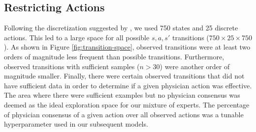 \documentclass[letterpaper]{article}
\begin{document}
\subsection{Restricting Actions}

Following the discretization suggested by \cite{DBLP:journals/corr/RaghuKCSG17}, we used 750 states and 25 discrete actions.
This led to a large space for all possible $s, a, s'$ transitions ($750 \times 25 \times 750$). 
As shown in Figure \ref{fig:transition-space}, observed transitions were at least two orders of magnitude
less frequent than possible transitions. Furthermore, observed transitions with sufficient 
samples ($n > 30$) were another order of magnitude smaller. Finally, there were certain
observed transitions that did not have sufficient data in order to determine if a given
physician action was effective. The area where there were sufficient examples but no physician consensus 
was deemed as the ideal exploration space for our mixture of experts. The percentage of physician 
consensus of a given action over all observed actions was a tunable hyperparameter used in our subsequent models.
\end{document}
